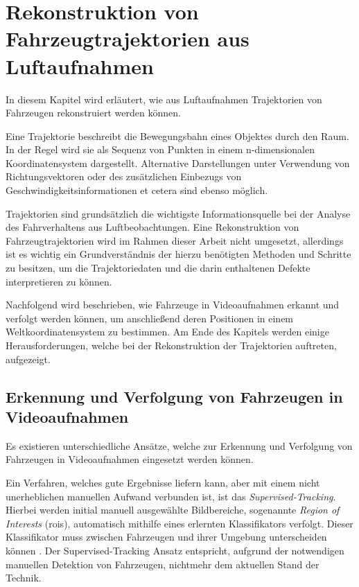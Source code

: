 
\chapter{Rekonstruktion von Fahrzeugtrajektorien aus Luftaufnahmen}
\label{sec:position_extraction}

In diesem Kapitel wird erläutert, wie aus Luftaufnahmen Trajektorien von Fahrzeugen rekonstruiert werden können.

\begin{theorem}[Trajektorie]
    Eine Trajektorie beschreibt die Bewegungsbahn eines Objektes durch den Raum.
    In der Regel wird sie als Sequenz von Punkten in einem n-dimensionalen Koordinatensystem dargestellt.
    Alternative Darstellungen unter Verwendung von Richtungsvektoren oder des zusätzlichen
    Einbezugs von Geschwindigkeitsinformationen et cetera sind ebenso möglich.
\end{theorem}

Trajektorien sind grundsätzlich die wichtigste Informationsquelle bei der Analyse des Fahrverhaltens aus Luftbeobachtungen.
Eine Rekonstruktion von Fahrzeugtrajektorien wird im Rahmen dieser Arbeit nicht umgesetzt,
allerdings ist es wichtig ein Grundverständnis der hierzu benötigten Methoden und Schritte zu besitzen,
um die Trajektoriedaten und die darin enthaltenen Defekte interpretieren zu können.

Nachfolgend wird beschrieben, wie Fahrzeuge in Videoaufnahmen erkannt und verfolgt
werden können, um anschließend deren Positionen in einem Weltkoordinatensystem zu bestimmen. Am Ende des Kapitels
werden einige Herausforderungen, welche bei der Rekonstruktion der Trajektorien auftreten, aufgezeigt.

\section{Erkennung und Verfolgung von Fahrzeugen in Videoaufnahmen}

Es existieren unterschiedliche Ansätze, welche zur Erkennung und Verfolgung von Fahrzeugen in Videoaufnahmen
eingesetzt werden können.

Ein Verfahren, welches gute Ergebnisse liefern kann, aber mit einem nicht unerheblichen manuellen Aufwand verbunden ist,
ist das \textit{Supervised-Tracking}. Hierbei werden initial manuell ausgewählte Bildbereiche, sogenannte
\textit{Region of Interests} (\acrshort*{roi}s), automatisch mithilfe eines erlernten Klassifikators verfolgt.
Dieser Klassifikator muss zwischen Fahrzeugen und ihrer Umgebung unterscheiden können \cite[]{Grabner}.
Der Supervised-Tracking Ansatz entspricht, aufgrund der notwendigen manuellen Detektion von Fahrzeugen, nichtmehr
dem aktuellen Stand der Technik.

